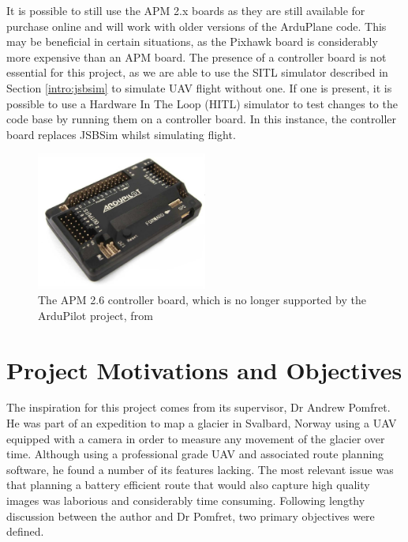 It is possible to still use the APM 2.x boards as they are still available for purchase online and will work with older versions of the ArduPlane code. This may be beneficial in certain situations, as the Pixhawk board is considerably more expensive than an APM board. The presence of a controller board is not essential for this project, as we are able to use the SITL simulator described in Section \ref{intro:jsbsim} to simulate UAV flight without one. If one is present, it is possible to use a Hardware In The Loop (HITL) simulator to test changes to the code base by running them on a controller board. In this instance, the controller board replaces JSBSim whilst simulating flight.

\begin{figure}[htbp!] 
\centering    
\includegraphics[width=0.5\textwidth]{APM2}
\caption[APM 2.6 controller board]{The APM 2.6 controller board, which is no longer supported by the ArduPilot project, from \cite{Apm2}}
\label{fig:apm2}
\end{figure}

\section{Project Motivations and Objectives} 
\label{intro:objectives}

The inspiration for this project comes from its supervisor, Dr Andrew Pomfret. He was part of an expedition to map a glacier in Svalbard, Norway using a UAV equipped with a camera in order to measure any movement of the glacier over time. Although using a professional grade UAV and associated route planning software, he found a number of its features lacking. The most relevant issue was that planning a battery efficient route that would also capture high quality images was laborious and considerably time consuming. Following lengthy discussion between the author and Dr Pomfret, two primary objectives were defined.

